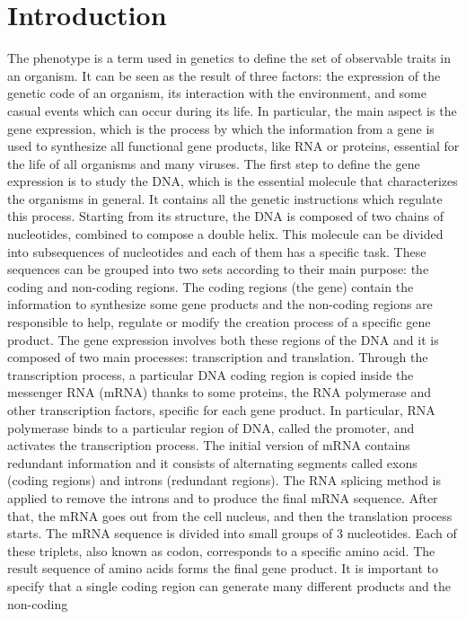 \section{Introduction}

The phenotype is a term used in genetics to define the set of observable
traits in an organism. It can be seen as the result of three factors:
the expression of the genetic code of an organism, its interaction with
the environment, and some casual events which can occur during its life.
In particular, the main aspect is the gene expression, which is the
process by which the information from a gene is used to synthesize all
functional gene products, like RNA or proteins, essential for the life
of all organisms and many viruses. The first step to define the gene
expression is to study the DNA, which is the essential molecule that
characterizes the organisms in general. It contains all the genetic
instructions which regulate this process. Starting from its structure,
the DNA is composed of two chains of nucleotides, combined to compose a
double helix. This molecule can be divided into subsequences of
nucleotides and each of them has a specific task. These sequences can be
grouped into two sets according to their main purpose: the coding and
non-coding regions. The coding regions (the gene) contain the
information to synthesize some gene products and the non-coding regions
are responsible to help, regulate or modify the creation process of a
specific gene product. The gene expression involves both these regions
of the DNA and it is composed of two main processes: transcription and
translation. Through the transcription process, a particular DNA coding
region is copied inside the messenger RNA (mRNA) thanks to some
proteins, the RNA polymerase and other transcription factors, specific
for each gene product. In particular, RNA polymerase binds to a
particular region of DNA, called the promoter, and activates the
transcription process. The initial version of mRNA contains redundant
information and it consists of alternating segments called exons (coding
regions) and introns (redundant regions). The RNA splicing method is
applied to remove the introns and to produce the final mRNA sequence.
After that, the mRNA goes out from the cell nucleus, and then the
translation process starts. The mRNA sequence is divided into small
groups of 3 nucleotides. Each of these triplets, also known as codon,
corresponds to a specific amino acid. The result sequence of amino acids
forms the final gene product. It is important to specify that a single
coding region can generate many different products and the non-coding
